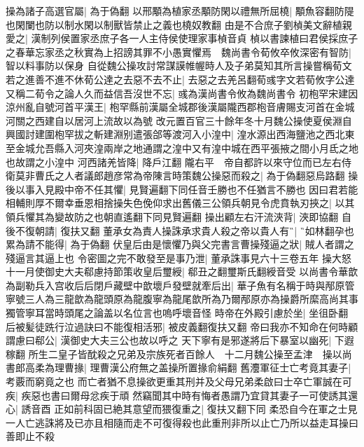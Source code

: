 操為諸子高選官屬|{
	為于偽翻}
以邢顒為植家丞顒防閑以禮無所屈橈|{
	顒魚容翻防隄也閑闌也防以制水閑以制獸皆禁止之義也橈奴教翻}
由是不合庶子劉楨美文辭植親愛之|{
	漢制列侯置家丞庶子各一人主侍侯使理家事楨音貞}
楨以書諫植曰君侯採庶子之春華忘家丞之秋實為上招謗其罪不小愚實懼焉　魏尚書令荀攸卒攸深密有智防|{
	智以料事防以保身}
自從魏公操攻討常謀謨帷幄時人及子弟莫知其所言操嘗稱荀文若之進善不進不休荀公達之去惡不去不止|{
	去惡之去羌呂翻荀彧字文若荀攸字公達}
又稱二荀令之論人久而益信吾沒世不忘|{
	彧為漢尚書令攸為魏尚書令}
初枹罕宋建因涼州亂自號河首平漢王|{
	枹罕縣前漢屬全城郡後漢屬隴西郡枹音膚賜支河首在金城河關之西建自以居河上流故以為號}
改元置百官三十餘年冬十月魏公操使夏侯淵自興國討建圍枹罕拔之斬建淵别遣張郃等渡河入小湟中|{
	湟水源出西海鹽池之西北東至金城允吾縣入河夾湟兩岸之地通謂之湟中又有湟中城在西平張掖之間小月氐之地也故謂之小湟中}
河西諸羌皆降|{
	降戶江翻}
隴右平　帝自都許以來守位而已左右侍衛莫非曹氏之人者議郎趙彦常為帝陳言時策魏公操惡而殺之|{
	為于偽翻惡烏路翻}
操後以事入見殿中帝不任其懼|{
	見賢遍翻下同任音壬勝也不任猶言不勝也}
因曰君若能相輔則厚不爾幸垂恩相捨操失色俛仰求出舊儀三公領兵朝見令虎賁執刃挾之|{
	以其領兵懼其為變故防之也朝直遙翻下同見賢遍翻}
操出顧左右汗流浹背|{
	浹即協翻}
自後不復朝請|{
	復扶又翻}
董承女為責人操誅承求貴人殺之帝以貴人有|{
	如林翻孕也}
累為請不能得|{
	為于偽翻}
伏皇后由是懷懼乃與父完書言曹操殘逼之狀|{
	賊人者謂之殘逼言其逼上也}
令密圖之完不敢發至是事乃泄|{
	董承誅事見六十三卷五年}
操大怒十一月使御史大夫郗慮持節策收皇后璽綬|{
	郗丑之翻璽斯氏翻綬音受}
以尚書令華歆為副勒兵入宫收后后閉戶藏壁中歆壞戶發壁就牽后出|{
	華子魚有名稱于時與邴原管寧號三人為三龍歆為龍頭原為龍腹寧為龍尾歆所為乃爾邴原亦為操爵所縻高尚其事獨管寧耳當時頭尾之論盖以名位言也嗚呼壞音怪}
時帝在外殿引慮於坐|{
	坐徂卧翻}
后被髪徒跣行泣過訣曰不能復相活邪|{
	被皮義翻復扶又翻}
帝曰我亦不知命在何時顧謂慮曰郗公|{
	漢御史大夫三公也故以呼之}
天下寧有是邪遂將后下暴室以幽死|{
	下遐稼翻}
所生二皇子皆酖殺之兄弟及宗族死者百餘人　十二月魏公操至孟津　操以尚書郎高柔為理曹掾|{
	理曹漢公府無之盖操所置掾俞絹翻}
舊灋軍征士亡考竟其妻子|{
	考覈而窮竟之也}
而亡者猶不息操欲更重其刑并及父母兄弟柔啟曰士卒亡軍誠在可疾|{
	疾惡也書曰爾母忿疾于頑}
然竊聞其中時有悔者愚謂乃宜貸其妻子一可使誘其還心|{
	誘音酉}
正如前科固已絶其意望而猥復重之|{
	復扶又翻下同}
柔恐自今在軍之士見一人亡逃誅將及已亦且相隨而走不可復得殺也此重刑非所以止亡乃所以益走耳操曰善即止不殺

